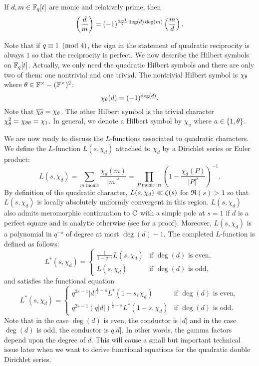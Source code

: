 \documentclass[12pt,reqno,oneside]{amsart}
\begin{document}
    \begin{theorem}
        If $d,m \in \mathbb{F}_{q}[t]$ are monic and relatively prime, then
        \[
            \left(\frac{d}{m}\right) = (-1)^{\frac{q-1}{2}\deg(d)\deg(m)}\left(\frac{m}{d}\right).
        \]
    \end{theorem}

    Note that if $q \equiv 1 \ \left(\text{mod }4\right)$, the sign in the statement of quadratic reciprocity is always $1$ so that the reciprocity is perfect. We now describe the Hilbert symbols on $\mathbb{F}_{q}[t]$. Actually, we only need the quadratic Hilbert symbols and there are only two of them: one nontrivial and one trivial. The nontrivial Hilbert symbol is $\chi_{\theta}$ where $\theta \in \mathbb{F}^{\times}-(\mathbb{F}^{\times})^{2}$:
    \[
        \chi_{\theta}(d) = (-1)^{\deg(d)}.
    \]
    Note that $\overline{\chi_{\theta}} = \chi_{\theta}$. The other Hilbert symbol is the trivial character $\chi_{\theta}^{2} = \chi_{\theta\theta} = \chi_{1}$. In general, we denote a Hilbert symbol by $\chi_{a}$ where $a \in \{1,\theta\}$.

    We are now ready to discuss the $L$-functions associated to quadratic characters. We define the $L$-function $L(s,\chi_{d})$ attached to $\chi_{d}$ by a Dirichlet series or Euler product:
    \[
        L(s,\chi_{d}) = \sum_{\text{$m$ monic}}\frac{\chi_{d}(m)}{|m|^{s}} = \prod_{\text{$P$ monic irr}}\left(1-\frac{\chi_{d}(P)}{|P|^{s}}\right)^{-1}.
    \]
    By definition of the quadratic character, $L(s,\chi_{d}) \ll \zeta(s)$ for $\Re(s) > 1$ so that $L(s,\chi_{d})$ is locally absolutely uniformly convergent in this region. $L(s,\chi_{d})$ also admits meromorphic continuation to $\mathbb{C}$ with a simple pole at $s = 1$ if $d$ is a perfect square and is analytic otherwise (see \cite{rosen2002number} for a proof). Moreover, $L(s,\chi_{d})$ is a polynomial in $q^{-s}$ of degree at most $\deg(d)-1$. The completed $L$-function is defined as follows:
    \[
        L^{\ast}(s,\chi_{d}) = \begin{cases} \frac{1}{1-q^{-s}}L(s,\chi_{d}) & \text{if $\deg(d)$ is even}, \\ L(s,\chi_{d}) & \text{if $\deg(d)$ is odd}, \end{cases}
    \]
    and satisfies the functional equation
    \[
        L^{\ast}(s,\chi_{d}) = \begin{cases} q^{2s-1}|d|^{\frac{1}{2}-s}L^{\ast}(1-s,\chi_{d}) & \text{if $\deg(d)$ is even}, \\ q^{2s-1}(q|d|)^{\frac{1}{2}-s}L^{\ast}(1-s,\chi_{d}) & \text{if $\deg(d)$ is odd}. \end{cases}
    \]
    Note that in the case $\deg(d)$ is even, the conductor is $|d|$ and in the case $\deg(d)$ is odd, the conductor is $q|d|$. In other words, the gamma factors depend upon the degree of $d$. This will cause a small but important technical issue later when we want to derive functional equations for the quadratic double Dirichlet series.
\end{document}
